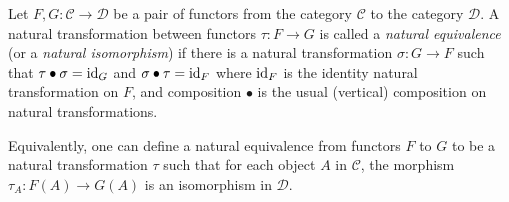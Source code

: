 \documentclass{article}
\begin{document}
Let $F,G: \mathcal{C}\to \mathcal{D}$ be a pair of functors from the category $\mathcal{C}$ to the category $\mathcal{D}$.  A natural transformation between functors $\tau : F\to G$ is called a {\em natural equivalence} (or a {\em natural isomorphism}) if there is a natural transformation $\sigma : G\to F$ such that $\tau\bullet \sigma = {\rm id}_G$ and $\sigma\bullet \tau = {\rm id}_F$ where ${\rm id}_F$ is the identity natural transformation on $F$, and composition $\bullet$ is the usual (vertical) composition on natural transformations.

Equivalently, one can define a natural equivalence from functors $F$ to $G$ to be a natural transformation $\tau$ such that for each object $A$ in $\mathcal{C}$, the morphism $\tau_A : F(A)\to G(A)$ is an isomorphism in $\mathcal{D}$.
\end{document}
